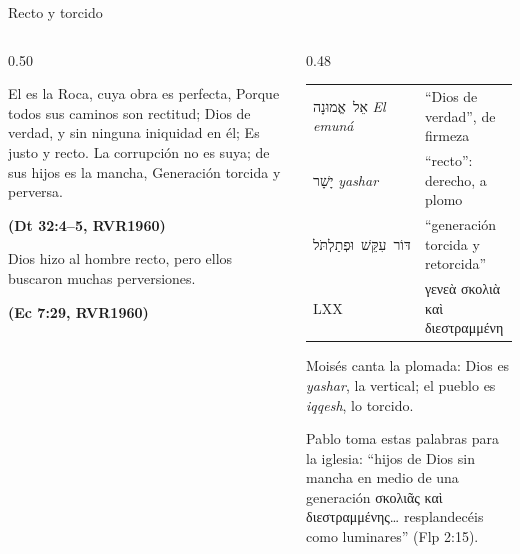 \documentclass[hyperref={bookmarks=false},aspectratio=169]{beamer}
\newcommand{\heb}[1]{\mbox{\foreignlanguage{hebrew}{#1}}}
\newcommand{\grc}[1]{\foreignlanguage{ancientgreek}{#1}}
\newcommand{\fuente}[1]{\par\hfill{\upshape\bfseries\footnotesize\textcolor{azul}{#1}}}
\begin{document}
\begin{frame}{Recto y torcido}
\begin{columns}[t,onlytextwidth]
\begin{column}{0.50\textwidth}
\begin{cita}El es la Roca, cuya obra es perfecta, Porque todos sus caminos son rectitud; Dios de verdad, y sin ninguna iniquidad en él; Es justo y recto. La corrupción no es suya; de sus hijos es la mancha, Generación torcida y perversa.\fuente{(Dt 32:4--5, RVR1960)}\end{cita}
\begin{cita}Dios hizo al hombre recto, pero ellos buscaron muchas perversiones.\fuente{(Ec 7:29, RVR1960)}\end{cita}
\end{column}
\begin{column}{0.48\textwidth}
\scriptsize\renewcommand{\arraystretch}{1.13}
\begin{tabular}{@{}>{\RaggedRight\arraybackslash}p{2.1cm}>{\RaggedRight\arraybackslash}p{3.3cm}@{}}
\toprule
\heb{אֵל אֱמוּנָה} \emph{El emuná} & ``Dios de verdad'', de firmeza \\
\heb{יָשָׁר} \emph{yashar} & ``recto'': derecho, a plomo \\
\heb{דּוֹר עִקֵּשׁ וּפְתַלְתֹּל} & ``generación torcida y retorcida'' \\
LXX & \grc{γενεὰ σκολιὰ καὶ διεστραμμένη} \\
\bottomrule
\end{tabular}\par\medskip
\small Moisés canta la plomada: Dios es \emph{yashar}, la vertical; el pueblo es \emph{iqqesh}, lo torcido.\par\smallskip
\scriptsize Pablo toma estas palabras para la iglesia: ``hijos de Dios sin mancha en medio de una generación \grc{σκολιᾶς καὶ διεστραμμένης}\ldots{} resplandecéis como luminares'' (Flp 2:15).
\end{column}
\end{columns}
\end{frame}
\end{document}
